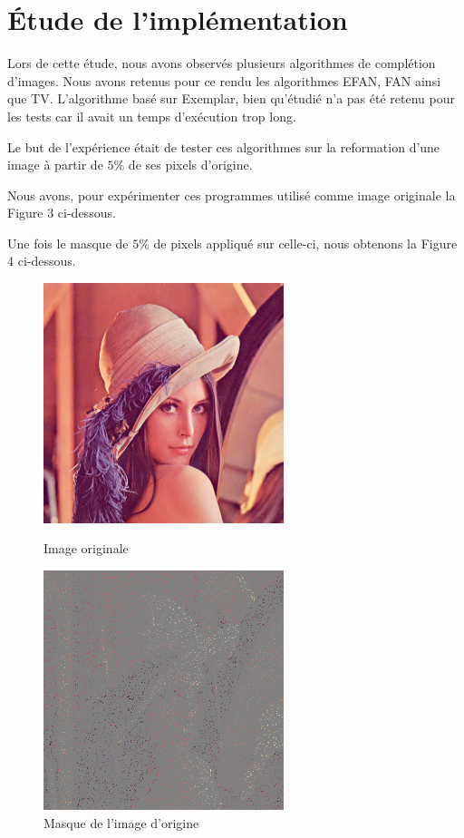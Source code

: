 \documentclass[]{article}
\begin{document}
\hypertarget{uxe9tude-de-limpluxe9mentation}{%
\section{Étude de
l'implémentation}\label{uxe9tude-de-limpluxe9mentation}}

Lors de cette étude, nous avons observés plusieurs algorithmes de
complétion d'images. Nous avons retenus pour ce rendu les algorithmes
EFAN, FAN ainsi que TV. L'algorithme basé sur Exemplar, bien qu'étudié
n'a pas été retenu pour les tests car il avait un temps d'exécution trop
long.

Le but de l'expérience était de tester ces algorithmes sur la
reformation d'une image à partir de \(5\%\) de ses pixels d'origine.

Nous avons, pour expérimenter ces programmes utilisé comme image
originale la Figure 3 ci-dessous.

Une fois le masque de \(5\%\) de pixels appliqué sur celle-ci, nous
obtenons la Figure 4 ci-dessous.

\begin{figure}
    \centering
    \begin{minipage}{.5\textwidth}
        \centering
        \includegraphics[height=7cm]{img/lena.png}
        \caption{Image originale}
    \end{minipage}%
    \begin{minipage}{.5\textwidth}
        \centering
        \includegraphics[height=7cm]{img/masked.png}
        \caption{Masque de l'image d'origine}
    \end{minipage}
\end{figure}
\end{document}

